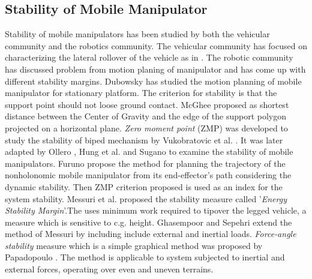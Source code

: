 \subsection{Stability of Mobile Manipulator}
Stability of mobile manipulators has been studied by both the vehicular community and the robotics community. The vehicular community has focused on characterizing the lateral rollover of the vehicle as in  \cite{buchele1990computer,jones1990engineering}. The robotic community has discussed problem from motion planing of manipulator and has come up with different stability margins. Dubowsky \cite{dubowsky1989planning} has studied the motion planning of mobile manipulator for stationary platform. The criterion for stability is that the support point should not loose ground contact. McGhee \cite{mcghee1968stability} proposed as shortest distance between the Center of Gravity  and the edge of the support polygon projected on a horizontal plane. \textit{Zero moment point} (ZMP) was developed to study the stability of biped mechanism by  Vukobratovic et al. \cite{vukobratovic1969contribution,vukobratovic2012biped}. It was later adapted by Ollero \cite{ollero1995stability} , Hung et al. \cite{huang1995manipulator,huang1994stability}  and Sugano \cite{sugano1993stability} to examine the stability of mobile manipulators. Furuno \cite{furuno2003trajectory} propose the method for planning the trajectory of the nonholonomic mobile manipulator from its end-effector's path  considering the dynamic stability. Then ZMP criterion proposed is used as an index for the system stability. Messuri et al. \cite{messuri1985automatic} proposed the stability measure called '\textit{Energy Stability Margin}'.The uses  minimum work required to tipover the legged vehicle, a measure which is sensitive to c.g. height. Ghasempoor and Sepehri \cite{ghasempoor1995measure}  extend the method of Messuri by including include external and inertial loads.   \textit{ Force-angle stability} measure which is a simple graphical method was proposed by Papadopoulo \cite{papadopoulos1996new,papadopoulos2000force}. The method is applicable to system subjected to inertial and external forces, operating over even and uneven terrains. 
